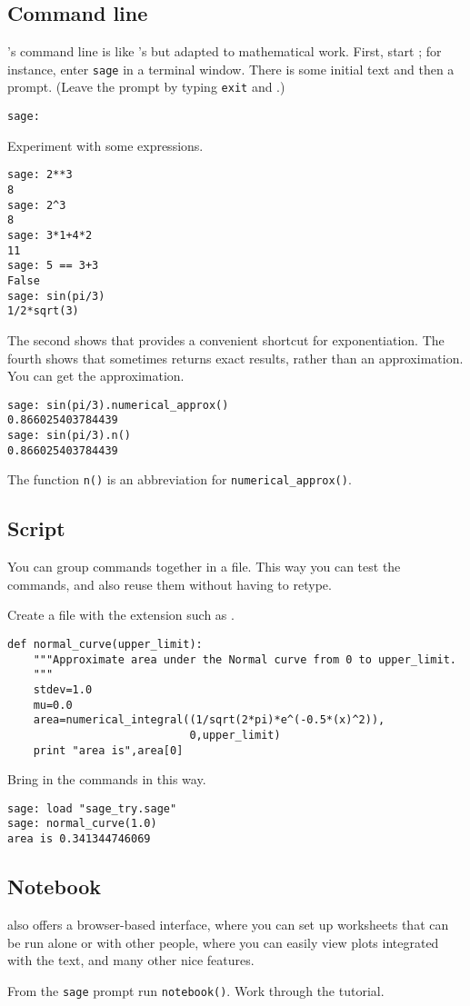\subsection{Command line}
\Sage's command line is like \python's but adapted to 
mathematical work.
First, start \Sage;
for instance, enter \lstinline[style=inline]!sage! in a terminal window.
There is some initial text and then a prompt.
(Leave the prompt by typing \lstinline[style=inline]!exit!
and .)
\begin{lstlisting}[style=python]
sage:  
\end{lstlisting}

Experiment with some expressions.
\begin{lstlisting}[style=python]
sage: 2**3                                                                           
8
sage: 2^3
8
sage: 3*1+4*2
11
sage: 5 == 3+3
False
sage: sin(pi/3)
1/2*sqrt(3)
\end{lstlisting}
The second shows that \Sage{} provides a convenient shortcut for exponentiation.
The fourth shows that \Sage{} sometimes returns exact results, rather than an
approximation.
You can get the approximation. 
\begin{lstlisting}[style=python]
sage: sin(pi/3).numerical_approx()
0.866025403784439
sage: sin(pi/3).n()
0.866025403784439  
\end{lstlisting}
The function \lstinline[style=inline]!n()! is an abbreviation for 
\lstinline[style=inline]!numerical_approx()!.


\subsection{Script}
You can group \Sage{} commands together in a file.
This way you can test the commands, 
and also reuse them without having to retype.

Create a file with the extension  such as .
\begin{lstlisting}[style=python]
def normal_curve(upper_limit):
    """Approximate area under the Normal curve from 0 to upper_limit.
    """
    stdev=1.0
    mu=0.0
    area=numerical_integral((1/sqrt(2*pi)*e^(-0.5*(x)^2)),
                            0,upper_limit)    
    print "area is",area[0]
\end{lstlisting}
Bring in the commands in this way.
\begin{lstlisting}[style=python]
sage: load "sage_try.sage"
sage: normal_curve(1.0)   
area is 0.341344746069  
\end{lstlisting}


\subsection{Notebook}
\Sage{} also offers a browser-based interface, where you can set up
worksheets that can be run alone or with other people, where you can easily
view plots integrated with the text, and many other nice features.

From the \lstinline[style=inline]!sage! prompt run \lstinline[style=inline]!notebook()!.
Work through the tutorial.
\endinput


TODO:
  1) save Sage session?
  2) exercises?